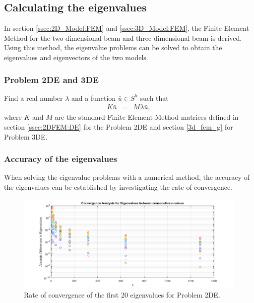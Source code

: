 \begin{figure}[h!]
{{\begin{minipage}[b]{0.7\linewidth}
				
			\end{minipage}
		}
	}
\end{figure}
\FloatBarrier

\subsection{Calculating the eigenvalues}
In section \ref{ssec:2D_Model:FEM} and \ref{ssec:3D_Model:FEM}, the Finite Element Method for the two-dimensional beam and three-dimensional beam is derived. Using this method, the eigenvalue problems can be solved to obtain the eigenvalues and eigenvectors of the two models.

\subsubsection{Problem 2DE and 3DE}
Find a real number $\lambda$ and a function $\bar{u} \in S^h$ such that
\begin{eqnarray}
	K\bar{u} & = & M\lambda{\bar{u}},
\end{eqnarray} where $K$ and $M$ are the standard Finite Element Method matrices defined in section \ref{ssec:2DFEM:DE} for the Problem 2DE and section \ref{3d_fem_g} for Problem 3DE.

\subsubsection{Accuracy of the eigenvalues}
When solving the eigenvalue problems with a numerical method, the accuracy of the eigenvalues can be established by investigating the rate of convergence. 

\begin{figure}[H]
    \centering
    \begin{adjustbox}{center}
        \includegraphics[scale=0.7]{files/Chapter4/Convergence.png}
    \end{adjustbox}
    \caption{Rate of convergence of the first 20 eigenvalues for Problem 2DE.}
    \label{fig:conv_2d_eig}
\end{figure}


